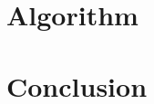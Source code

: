 \documentclass[
oneside,
fontsize=11pt
]{scrartcl}
\begin{document}



\section{Algorithm}





\section{Conclusion}






\newpage
\appendix  %




\end{document}
